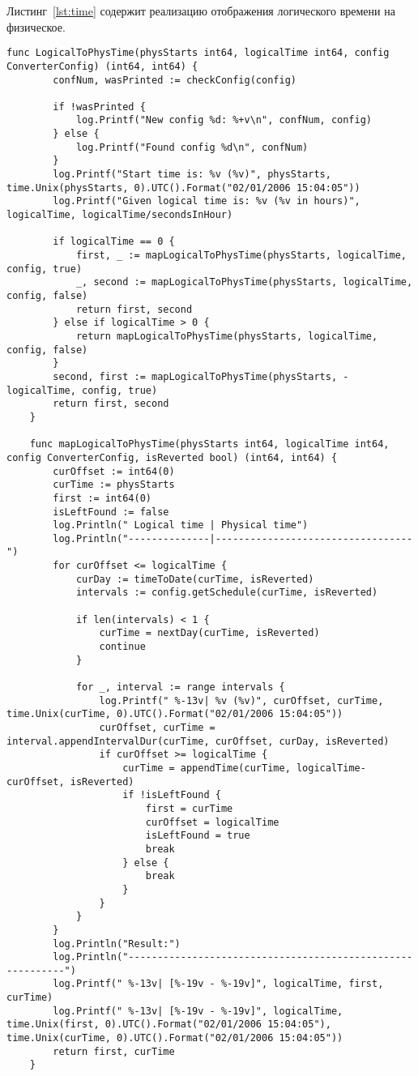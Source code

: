 Листинг~\ref{lst:time} содержит реализацию отображения логического времени на физическое.

\begin{lstlisting}[language=Golang,caption={Реализация отображения логического времени на физическое},label=lst:time]
	func LogicalToPhysTime(physStarts int64, logicalTime int64, config ConverterConfig) (int64, int64) {
		confNum, wasPrinted := checkConfig(config)
	
		if !wasPrinted {
			log.Printf("New config %d: %+v\n", confNum, config)
		} else {
			log.Printf("Found config %d\n", confNum)
		}
		log.Printf("Start time is: %v (%v)", physStarts, time.Unix(physStarts, 0).UTC().Format("02/01/2006 15:04:05"))
		log.Printf("Given logical time is: %v (%v in hours)", logicalTime, logicalTime/secondsInHour)
	
		if logicalTime == 0 {
			first, _ := mapLogicalToPhysTime(physStarts, logicalTime, config, true)
			_, second := mapLogicalToPhysTime(physStarts, logicalTime, config, false)
			return first, second
		} else if logicalTime > 0 {
			return mapLogicalToPhysTime(physStarts, logicalTime, config, false)
		}
		second, first := mapLogicalToPhysTime(physStarts, -logicalTime, config, true)
		return first, second
	}
	
	func mapLogicalToPhysTime(physStarts int64, logicalTime int64, config ConverterConfig, isReverted bool) (int64, int64) {
		curOffset := int64(0)
		curTime := physStarts
		first := int64(0)
		isLeftFound := false
		log.Println(" Logical time | Physical time")
		log.Println("--------------|----------------------------------")
		for curOffset <= logicalTime {
			curDay := timeToDate(curTime, isReverted)
			intervals := config.getSchedule(curTime, isReverted)
	
			if len(intervals) < 1 {
				curTime = nextDay(curTime, isReverted)
				continue
			}
	
			for _, interval := range intervals {
				log.Printf(" %-13v| %v (%v)", curOffset, curTime, time.Unix(curTime, 0).UTC().Format("02/01/2006 15:04:05"))
				curOffset, curTime = interval.appendIntervalDur(curTime, curOffset, curDay, isReverted)
				if curOffset >= logicalTime {
					curTime = appendTime(curTime, logicalTime-curOffset, isReverted)
					if !isLeftFound {
						first = curTime
						curOffset = logicalTime
						isLeftFound = true
						break
					} else {
						break
					}
				}
			}
		}
		log.Println("Result:")
		log.Println("-----------------------------------------------------------")
		log.Printf(" %-13v| [%-19v - %-19v]", logicalTime, first, curTime)
		log.Printf(" %-13v| [%-19v - %-19v]", logicalTime, time.Unix(first, 0).UTC().Format("02/01/2006 15:04:05"), time.Unix(curTime, 0).UTC().Format("02/01/2006 15:04:05"))
		return first, curTime
	}
	

\end{lstlisting}
